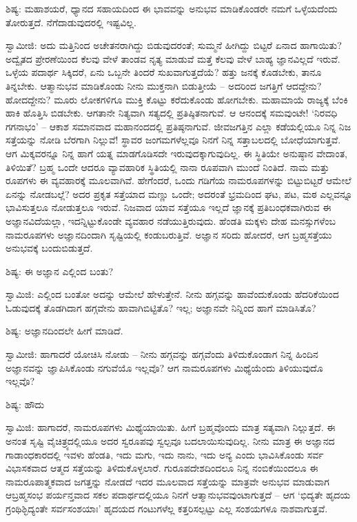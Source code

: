 ಶಿಷ್ಯ: ಮಹಾಶಯರೆ, ಧ್ಯಾನದ ಸಹಾಯದಿಂದ ಈ ಭಾವವನ್ನು ಅನುಭವ ಮಾಡಿಕೊಂಡರೇ ನಮಗೆ ಒಳ್ಳೆಯದೆಂದು ತೋರುತ್ತದೆ. ನೆಗೆದಾಡುವುದರಲ್ಲಿ ಇಷ್ಟವಿಲ್ಲ.

ಸ್ವಾಮೀಜಿ: ಅದು ಮತ್ತಿನಿಂದ ಅಚೇತನರಾಗಿದ್ದು ಬಿಡುವುದರಂತೆ; ಸುಮ್ಮನೆ ಹೀಗಿದ್ದು ಬಿಟ್ಟರೆ ಏನಾದ ಹಾಗಾಯಿತು? ಅದ್ವೈತದ ಪ್ರೇರಣೆಯಿಂದ ಕೆಲವು ವೇಳೆ ತಾಂಡವ ನೃತ್ಯ ಮಾಡುವೆ ಮತ್ತೆ ಕೆಲವು ವೇಳೆ ಬಾಹ್ಯ ಜ್ಞಾನವಿಲ್ಲದೆ ಇರುವೆ. ಒಳ್ಳೆಯ ಪದಾರ್ಥ ಸಿಕ್ಕಿದರೆ, ಏನು ಒಬ್ಬನೇ ತಿಂದರೆ ಸುಖವಾಗುತ್ತದೆಯೆ? ಹತ್ತು ಜನಕ್ಕೆ ಕೊಡಬೇಕು, ತಾನೂ ತಿನ್ನಬೇಕು. ಆತ್ಮಾನುಭವ ಮಾಡಿಕೊಂಡು ನೀನು ಮುಕ್ತನಾಗಿ ಬಿಡುತ್ತೀಯೆ – ಅದರಿಂದ ಜಗತ್ತಿಗೆ ಆದದ್ದೇನು? ಹೋದದ್ದೇನು? ಮೂರು ಲೋಕಗಳಿಗೂ ಮುಕ್ತಿ ಕೊಟ್ಟು ಕರೆದುಕೊಂಡು ಹೋಗಬೇಕು. ಮಹಾಮಾಯೆ ರಾಜ್ಯಕ್ಕೆ ಬೆಂಕಿ ಹಾಕಿ ಹೊತ್ತಿಸಿ ಬಿಡಬೇಕು. ಆಗತಾನೇ ನಿತ್ಯವಾಗಿ ಸತ್ಯದಲ್ಲಿ ಪ್ರತಿಷ್ಠಿತನಾಗುವೆ. ಆ ಆನಂದಕ್ಕೆ ಸಮವುಂಟೇ! ‘ನಿರವಧಿ ಗಗನಾಭಂ’ – ಆಕಾಶ ಸಮಾನವಾದ ಮಹಾನಂದದಲ್ಲಿ ಪ್ರತಿಷ್ಠನಾಗುವೆ. ಜೀವಜಗತ್ತಿನ ಎಲ್ಲಾ ಕಡೆಯಲ್ಲಿಯೂ ನಿನ್ನ ನಿಜ ಸತ್ತೆಯನ್ನು ನೋಡಿ ಬೆರಗಾಗಿ ನಿಲ್ಲುವೆ! ಸ್ಥಾವರ ಜಂಗಮಗಳೆಲ್ಲವೂ ನಿನಗೆ ನಿನ್ನ ಸತ್ತಾಬಲದಲ್ಲಿ ಬೋಧೆಯಾಗುತ್ತವೆ. ಆಗ ಮಿಕ್ಕವರನ್ನೂ ನಿನ್ನ ಹಾಗೆ ಯತ್ನ ಮಾಡಗೊಡಿಸದೇ ಇರುವುದಕ್ಕಾಗುವುದಿಲ್ಲ. ಈ ಸ್ಥಿತಿಯೇ ಅನುಷ್ಠಾನ ವೇದಾಂತ, ತಿಳಿಯಿತೆ? ಬ್ರಹ್ಮ ಒಂದೇ ಆದರೂ ವ್ಯಾವಹಾರಿಕ ಸ್ಥಿತಿಯಲ್ಲಿ ನಾನಾ ರೂಪವಾಗಿ ಮುಂದೆ ನಿಂತಿದೆ. ನಾಮ ಮತ್ತು ರೂಪಗಳು ಈ ವ್ಯವಹಾರಕ್ಕೆ ಮೂಲವಾಗಿವೆ. ಹೇಗೆಂದರೆ, ಒಂದು ಗಡಿಗೆಯ ನಾಮರೂಪಗಳನ್ನು ಬಿಟ್ಟುಬಿಟ್ಟರೆ ಆಮೇಲೆ ಏನನ್ನು ನೋಡಬಲ್ಲೆ? ಅದರ ಪ್ರಕೃತ ಸತ್ತೆಯಾದ ಮಣ್ಣು ಒಂದೇ; ಅದರಂತೆ ಭ್ರಮದಿಂದ ಘಟ, ಪಟ, ಮಠ ಎಲ್ಲವನ್ನೂ ಭಾವಿಸುತ್ತಲೂ ನೋಡುತ್ತಲೂ ಇರುವೆ. ನಿಜವಾದ ಯಾವ ಸತ್ತೆಯೂ ಇಲ್ಲದೆ ಜ್ಞಾನಕ್ಕೆ ಪ್ರತಿಬಂಧಕವಾಗಿರುವ ಈ ಅಜ್ಞಾನವಿದೆಯಲ್ಲಾ, ಇದನ್ನಿಟ್ಟುಕೊಂಡೇ ವ್ಯವಹಾರ ನಡೆಯುತ್ತಿರುವುದು. ಹೆಂಡತಿ ಮಕ್ಕಳು ದೇಹ ಮನಸ್ಸುಗಳೆಂಬ ನಾಮರೂಪಗಳು ಅಜ್ಞಾನದಿಂದಾಗಿ ಸೃಷ್ಟಿಯಲ್ಲಿ ಕಂಡುಬರುತ್ತಿವೆ. ಅಜ್ಞಾನ ಸರಿದು ಹೋದರೆ, ಆಗ ಬ್ರಹ್ಮಸತ್ತೆಯು ಅನುಭವಕ್ಕೆ ಬಂದುಬಿಡುತ್ತದೆ.

ಶಿಷ್ಯ: ಈ ಅಜ್ಞಾನ ಎಲ್ಲಿಂದ ಬಂತು?

ಸ್ವಾಮಿಜಿ: ಎಲ್ಲಿಂದ ಬಂತೋ ಅದನ್ನು ಆಮೇಲೆ ಹೇಳುತ್ತೇನೆ. ನೀನು ಹಗ್ಗವನ್ನು ಹಾವೆಂದುಕೊಂಡು ಹೆದರಿಕೆಯಿಂದ ಓಡುವುದಕ್ಕೆ ತೊಡಗಿದಾಗ ಹಗ್ಗವೇನು ಹಾವಾಗಿಬಿಟ್ಟಿತೊ? ಇಲ್ಲ; ಅಜ್ಞಾನವೇ ನಿನ್ನಿಂದ ಹಾಗೆ ಮಾಡಿಸಿತೊ?

ಶಿಷ್ಯ: ಅಜ್ಞಾನದಿಂದಲೇ ಹೀಗೆ ಮಾಡಿದೆ.

ಸ್ವಾಮೀಜಿ: ಹಾಗಾದರೆ ಯೋಚಿಸಿ ನೋಡು – ನೀನು ಹಗ್ಗವನ್ನು ಹಗ್ಗವೆಂದು ತಿಳಿದುಕೊಂಡಾಗ ನಿನ್ನ ಹಿಂದಿನ ಅಜ್ಞಾನವನ್ನು ಜ್ಞಾಪಿಸಿಕೊಂಡು ನಗುವೆಯೊ ಇಲ್ಲವೊ? ಆಗ ನಾಮರೂಪಗಳು ಮಿಥ್ಯೆಯೆಂದು ತಿಳಿಯುವುದೊ ಇಲ್ಲವೊ?

ಶಿಷ್ಯ: ಹೌದು

ಸ್ವಾಮಿಜಿ: ಹಾಗಾದರೆ, ನಾಮರೂಪಗಳು ಮಿಥ್ಯೆಯಾಯಿತು. ಹೀಗೆ ಬ್ರಹ್ಮವೊಂದು ಮಾತ್ರ ಸತ್ಯವಾಗಿ ನಿಲ್ಲುತ್ತದೆ. ಈ ಅನಂತ ಸೃಷ್ಟಿ ವೈಚಿತ್ರ್ಯದಲ್ಲಿಯೂ ಅದರ ಸ್ವರೂಪವು ಸ್ವಲ್ಪವೂ ಬದಲಾಯಿಸುವುದಿಲ್ಲ. ನೀನು ಮಾತ್ರ ಈ ಅಜ್ಞಾನದ ಗಾಡಾಂಧಕಾರದಲ್ಲಿ ಇವಳು ಹೆಂಡತಿ, ಇದು ಮಗು, ಇದು ನಾನು, ಇದು ಅನ್ಯ ಎಂದು ಭಾವಿಸಿಕೊಂಡು ಸರ್ವ ವಿಭಾಸಕವಾದ ಆತ್ಮದ ಸತ್ತೆಯನ್ನು ತಿಳಿದುಕೊಳ್ಳಲಾರೆ. ಗುರೂಪದೇಶದಿಂದಲೂ ನಿನ್ನ ನಂಬಿಕೆಯಿಂದಲೂ ಈ ನಾಮರೂಪಾತ್ಮಕವಾದ ಜಗತ್ತನ್ನು ನೋಡದೆ ಇದರ ಮೂಲವಾದ ಸತ್ತೆಯನ್ನು ಮಾತ್ರವೇ ಅನುಭವ ಮಾಡುವಾಗ ಆಬ್ರಹ್ಮಸಂಭ ಪರ್ಯನ್ತವಾದ ಸಕಲ ಪದಾರ್ಥದಲ್ಲಿಯೂ ನಿನಗೆ ಆತ್ಮಾನುಭವವುಂಟಾಗುತ್ತದೆ – ಆಗ ‘ಭಿದ್ಯತೇ ಹೃದಯ ಗ್ರಂಥಿಶ್ಛಿದ್ಯಂತೇ ಸರ್ವಸಂಶಯಾಃ’ ಹೃದಯದ ಗಂಟುಗಳೆಲ್ಲ ಕತ್ತರಿಸಲ್ಪಟ್ಟು ಎಲ್ಲ ಸಂಶಯಗಳೂ ನಾಶವಾಗುತ್ತವೆ.

